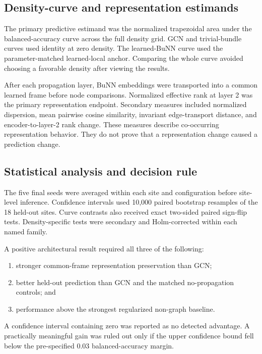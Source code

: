 \documentclass[11pt,a4paper]{article}
\begin{document}
\subsection{Density-curve and representation estimands}

The primary predictive estimand was the normalized trapezoidal area under the
balanced-accuracy curve across the full density grid. GCN and trivial-bundle
curves used identity at zero density. The learned-BuNN curve used the
parameter-matched learned-local anchor. Comparing the whole curve avoided
choosing a favorable density after viewing the results.

After each propagation layer, BuNN embeddings were transported into a common
learned frame before node comparisons. Normalized effective rank at layer 2
was the primary representation endpoint. Secondary measures included
normalized dispersion, mean pairwise cosine similarity, invariant
edge-transport distance, and encoder-to-layer-2 rank change. These measures
describe co-occurring representation behavior. They do not prove that a
representation change caused a prediction change.

\subsection{Statistical analysis and decision rule}

The five final seeds were averaged within each site and configuration before
site-level inference. Confidence intervals used 10,000 paired bootstrap
resamples of the 18 held-out sites. Curve contrasts also received exact
two-sided paired sign-flip tests. Density-specific tests were secondary and
Holm-corrected within each named family.

A positive architectural result required all three of the following:
\begin{enumerate}
  \item stronger common-frame representation preservation than GCN;
  \item better held-out prediction than GCN and the matched no-propagation
  controls; and
  \item performance above the strongest regularized non-graph baseline.
\end{enumerate}

A confidence interval containing zero was reported as no detected advantage.
A practically meaningful gain was ruled out only if the upper confidence
bound fell below the pre-specified 0.03 balanced-accuracy margin.
\end{document}
